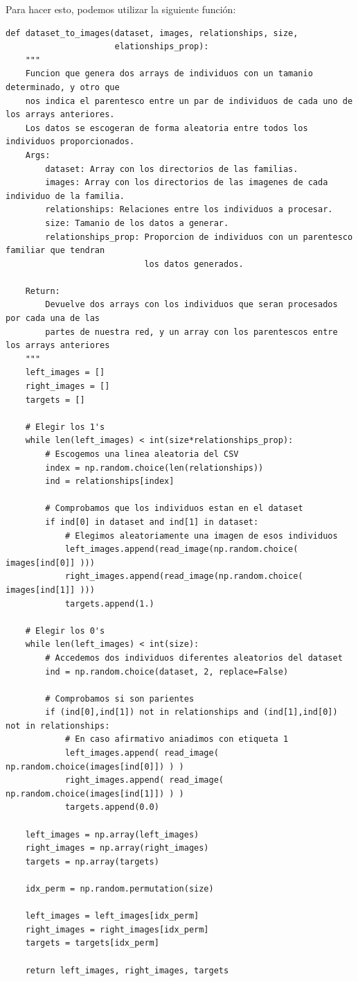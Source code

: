\documentclass[11pt,a4paper]{article}
\begin{document}
Para hacer esto, podemos utilizar la siguiente función:

\begin{lstlisting}
def dataset_to_images(dataset, images, relationships, size, 
                      elationships_prop):
    """
    Funcion que genera dos arrays de individuos con un tamanio determinado, y otro que
    nos indica el parentesco entre un par de individuos de cada uno de los arrays anteriores.
    Los datos se escogeran de forma aleatoria entre todos los individuos proporcionados.
    Args:
        dataset: Array con los directorios de las familias.
        images: Array con los directorios de las imagenes de cada individuo de la familia.
        relationships: Relaciones entre los individuos a procesar.
        size: Tamanio de los datos a generar.
        relationships_prop: Proporcion de individuos con un parentesco familiar que tendran
                            los datos generados.
    
    Return:
        Devuelve dos arrays con los individuos que seran procesados por cada una de las
        partes de nuestra red, y un array con los parentescos entre los arrays anteriores
    """    
    left_images = []
    right_images = []
    targets = []

    # Elegir los 1's
    while len(left_images) < int(size*relationships_prop):
        # Escogemos una linea aleatoria del CSV
        index = np.random.choice(len(relationships))
        ind = relationships[index]

        # Comprobamos que los individuos estan en el dataset
        if ind[0] in dataset and ind[1] in dataset:
            # Elegimos aleatoriamente una imagen de esos individuos
            left_images.append(read_image(np.random.choice( images[ind[0]] )))
            right_images.append(read_image(np.random.choice( images[ind[1]] )))
            targets.append(1.)

    # Elegir los 0's
    while len(left_images) < int(size):
        # Accedemos dos individuos diferentes aleatorios del dataset
        ind = np.random.choice(dataset, 2, replace=False)

        # Comprobamos si son parientes
        if (ind[0],ind[1]) not in relationships and (ind[1],ind[0]) not in relationships:
            # En caso afirmativo aniadimos con etiqueta 1
            left_images.append( read_image( np.random.choice(images[ind[0]]) ) )
            right_images.append( read_image( np.random.choice(images[ind[1]]) ) )
            targets.append(0.0)
    
    left_images = np.array(left_images)
    right_images = np.array(right_images)
    targets = np.array(targets)

    idx_perm = np.random.permutation(size)

    left_images = left_images[idx_perm]
    right_images = right_images[idx_perm]
    targets = targets[idx_perm]

    return left_images, right_images, targets
\end{lstlisting}
\end{document}
